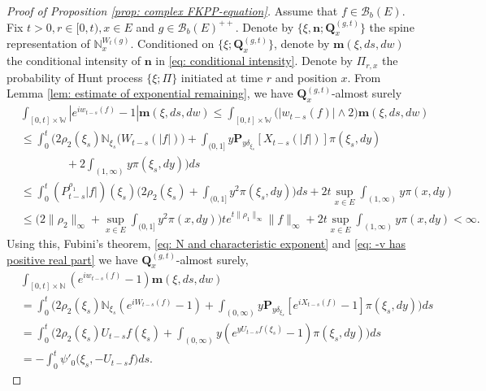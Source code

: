 \documentclass[12pt,a4paper]{amsart}
\theoremstyle{plain}
\theoremstyle{definition}
\numberwithin{equation}{section}
\begin{document}
\begin{proof}[Proof of Proposition \ref{prop: complex FKPP-equation}]
    Assume that $f\in \mathcal B_b(E)$.
    Fix $t>0, r\in [0,t), x\in E$ and $g\in \mathcal B_b(E)^{++}$.
    Denote by $\{\xi, \mathbf n; \mathbf Q_x^{(g,t)}\}$ the spine representation of $\mathbb N_x^{W_t(g)}$.
    Conditioned on $\{\xi; \mathbf Q_x^{(g,t)}\}$, denote by $\mathbf m(\xi, ds,dw)$ the conditional intensity of $\mathbf n$ in \eqref{eq: conditional intensity}.
    Denote by $\Pi_{r,x}$ the probability of Hunt process $\{\xi; \Pi\}$ initiated at time $r$ and position $x$.
    From Lemma \ref{lem: estimate of exponential remaining}, we have $\mathbf Q^{(g,t)}_{x}$-almost surely
\begin{equation}\begin{split}
    &\int_{[0,t]\times \mathbb W}|e^{i w_{t-s}(f)} - 1| \mathbf m(\xi, ds,dw)
    \leq \int_{[0,t]\times \mathbb W}\big(| w_{t-s}(f)| \wedge 2\big) \mathbf m(\xi, ds,dw)
    \\&\leq \int_0^t \Big(2\rho_2(\xi_s)\mathbb N_{\xi_s}\big( W_{t-s}(|f|)\big)  + \int_{(0,1]} y \mathbf P_{y \delta_{\xi_s}}[ X_{t-s}(|f|)] \pi(\xi_s,dy)
    \\&\qquad\qquad+ 2\int_{(1,\infty)}y\pi(\xi_s,dy)\Big) ds
     \\&\leq \int_0^t (P_{t-s}^{\rho_1} |f|)(\xi_s)\Big(2\rho_2(\xi_s)  + \int_{(0,1]} y^2 \pi(\xi_s,dy)\Big) ds + 2t \sup_{x\in E}\int_{(1,\infty)}y\pi(x,dy)
    \\&\leq \Big(2\|\rho_2\|_\infty +\sup_{x\in E}\int_{(0,1]} y^2 \pi(x,dy)\Big) t e^{t\|\rho_1\|_\infty}\|f\|_\infty + 2t \sup_{x\in E}\int_{(1,\infty)}y\pi(x,dy)
    < \infty.
\end{split}\end{equation}
    Using this, Fubini's theorem, \eqref{eq: N and characteristic exponent} and \eqref{eq: -v has positive real part} we have $\mathbf Q^{(g,t)}_{x}$-almost surely,
\begin{equation}\begin{split}
    &\int_{[0,t]\times \mathbb N}(e^{i w_{t-s}(f)} - 1) \mathbf m(\xi, ds,dw)
    \\&=\int_0^t \Big(2\rho_2(\xi_s)\mathbb N_{\xi_s}(e^{i W_{t-s}(f)} - 1)  + \int_{(0,\infty)} y \mathbf P_{y \delta_{\xi_s}}[e^{i X_{t-s}(f)} - 1] \pi(\xi_s,dy)\Big) ds
    \\&=\int_0^t \Big( 2\rho_2(\xi_s) U_{t-s} f(\xi_s) + \int_{(0,\infty)} y (e^{y U_{t-s}f(\xi_s)} - 1) \pi(\xi_s,dy) \Big) ds
    \\&= -\int_0^t \psi'_0 \big(\xi_s, -U_{t-s}f\big)ds.

\end{split}
\end{equation}
\end{proof}
\end{document}
